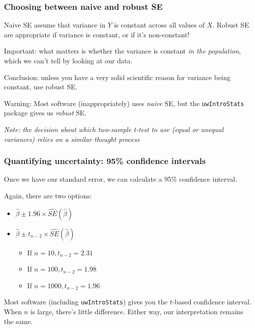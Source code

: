 \documentclass[12pt, 
hyperref={colorlinks=true, linkcolor=blue, urlcolor=cyan}]{beamer}
\begin{document}
\begin{frame}
\frametitle{Choosing between naive and robust SE}

Naive SE assume that variance in $Y$ is constant across all values of $X$. Robust SE are appropriate if variance is constant, or if it's non-constant!

\color{blue} Important: \color{black} what matters is whether the variance is constant \textit{in the population}, which we can't tell by looking at our data.

\color{blue} Conclusion: \color{black} unless you have a very solid scientific reason for variance being constant, use robust SE.

\color{red} Warning: \color{black} Most software (inappropriately) uses \textit{naive} SE, but the \texttt{uwIntroStats} package gives us \textit{robust} SE. %

\begin{footnotesize} \textit{Note: the decision about which two-sample t-test to use (equal or unequal variances) relies on a similar thought process} \end{footnotesize}
\end{frame}


\begin{frame}
\frametitle{Quantifying uncertainty: 95\% confidence intervals}

Once we have our standard error, we can calculate a 95\% confidence interval. 

Again, there are two options: \vspace{-0.3cm}
\begin{itemize}
\item $\hat{\beta} \pm 1.96 \times \widehat{SE}(\hat\beta)$
\item $\hat{\beta} \pm t_{n-2} \times \widehat{SE}(\hat\beta)$
	\begin{itemize}
	\item If $n = 10, t_{n-2} = 2.31$
	\item If $n = 100, t_{n-2} = 1.98$
	\item If $n = 1000, t_{n-2} = 1.96$
	\end{itemize}
\end{itemize}

Most software (including \texttt{uwIntroStats}) gives you the $t$-based confidence interval. When $n$ is large, there's little difference. Either way, our interpretation remains the same.

\end{frame}
\end{document}
